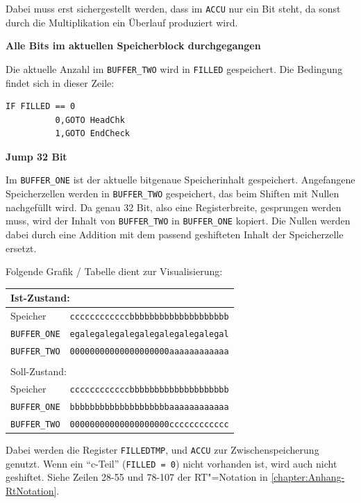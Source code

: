 Dabei muss erst sichergestellt werden, dass im \texttt{ACCU} nur ein Bit steht, da sonst durch die Multiplikation ein Überlauf produziert wird.

\textbf{Alle Bits im aktuellen Speicherblock durchgegangen}

Die aktuelle Anzahl im \texttt{BUFFER\_TWO} wird in \texttt{FILLED} gespeichert. Die Bedingung findet sich in dieser Zeile:

\begin{verbatim}
IF FILLED == 0
          0,GOTO HeadChk
          1,GOTO EndCheck
\end{verbatim}

\textbf{Jump 32 Bit}

Im \texttt{BUFFER\_ONE} ist der aktuelle bitgenaue Speicherinhalt gespeichert. Angefangene Speicherzellen werden in \texttt{BUFFER\_TWO} gespeichert, das beim Shiften mit Nullen nachgefüllt wird. Da genau 32 Bit, also eine Registerbreite, gesprungen werden muss, wird der Inhalt von \texttt{BUFFER\_TWO} in \texttt{BUFFER\_ONE} kopiert. Die Nullen werden dabei durch eine Addition mit dem passend geshifteten Inhalt der Speicherzelle ersetzt.

\pagebreak

Folgende Grafik / Tabelle dient zur Visualisierung:

\begin{tabular}{|l|l|}
\multicolumn{2}{l}{Ist-Zustand:}\\
\hline
Speicher   & \texttt{ccccccccccccbbbbbbbbbbbbbbbbbbbb}\\
\hline
\texttt{BUFFER\_ONE} & \texttt{egalegalegalegalegalegalegalegal}\\
\hline
\texttt{BUFFER\_TWO} & \texttt{00000000000000000000aaaaaaaaaaaa}\\
\hline
\multicolumn{2}{l}{}\\
\multicolumn{2}{l}{Soll-Zustand:}\\
\hline
Speicher   & \texttt{ccccccccccccbbbbbbbbbbbbbbbbbbbb}\\
\hline
\texttt{BUFFER\_ONE} & \texttt{bbbbbbbbbbbbbbbbbbbbaaaaaaaaaaaa}\\
\hline
\texttt{BUFFER\_TWO} & \texttt{00000000000000000000cccccccccccc}\\
\hline
\end{tabular}

Dabei werden die Register \texttt{FILLEDTMP}, und \texttt{ACCU} zur Zwischenspeicherung genutzt. Wenn ein "`c-Teil"' (\texttt{FILLED = 0}) nicht vorhanden ist, wird auch nicht geshiftet. Siehe Zeilen 28-55 und 78-107 der RT"=Notation in \autoref{chapter:Anhang-RtNotation}.

